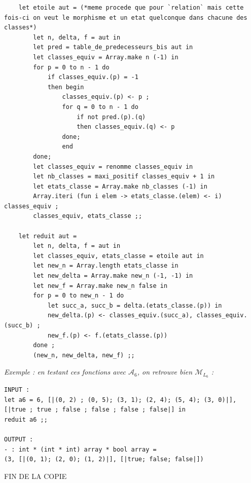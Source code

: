 \documentclass{article}
\begin{document}
\begin{enumerate}
\begin{verbatim}
    let etoile aut = (*meme procede que pour `relation` mais cette fois-ci on veut le morphisme et un etat quelconque dans chacune des classes*)
        let n, delta, f = aut in
        let pred = table_de_predecesseurs_bis aut in
        let classes_equiv = Array.make n (-1) in
        for p = 0 to n - 1 do
            if classes_equiv.(p) = -1
            then begin 
                classes_equiv.(p) <- p ;
                for q = 0 to n - 1 do 
                    if not pred.(p).(q) 
                    then classes_equiv.(q) <- p
                done;
                end
        done;
        let classes_equiv = renomme classes_equiv in
        let nb_classes = maxi_positif classes_equiv + 1 in
        let etats_classe = Array.make nb_classes (-1) in
        Array.iteri (fun i elem -> etats_classe.(elem) <- i) classes_equiv ;
        classes_equiv, etats_classe ;;

    let reduit aut = 
        let n, delta, f = aut in 
        let classes_equiv, etats_classe = etoile aut in
        let new_n = Array.length etats_classe in
        let new_delta = Array.make new_n (-1, -1) in 
        let new_f = Array.make new_n false in 
        for p = 0 to new_n - 1 do
            let succ_a, succ_b = delta.(etats_classe.(p)) in 
            new_delta.(p) <- classes_equiv.(succ_a), classes_equiv.(succ_b) ;
            new_f.(p) <- f.(etats_classe.(p))
        done ;
        (new_n, new_delta, new_f) ;;
    \end{verbatim}

    \textit{Exemple : en testant ces fonctions avec $\mathcal{A}_6$, on retrouve bien $\mathcal{M}_{L_6}$ :}
    \begin{verbatim}
INPUT :
let a6 = 6, [|(0, 2) ; (0, 5); (3, 1); (2, 4); (5, 4); (3, 0)|], [|true ; true ; false ; false ; false ; false|] in
reduit a6 ;;

OUTPUT : 
- : int * (int * int) array * bool array =
(3, [|(0, 1); (2, 0); (1, 2)|], [|true; false; false|])
    \end{verbatim}
\end{enumerate}

\null
\begin{center}
        F\footnotesize{IN DE LA COPIE}
    \end{center}
\end{document}
